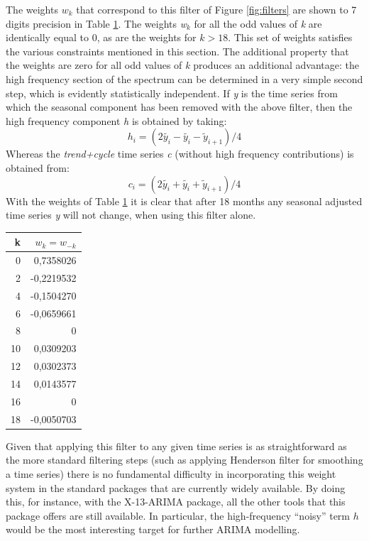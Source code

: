 \documentclass[english,blauw]{cbsdiscussionpaper}
\begin{document}
The weights $w_k$ that correspond to this filter of Figure \ref{fig:filters} are shown to 7 digits precision in Table \ref{tab:digits}. The weights \textit{w$_k$} for all the odd values of \textit{k} are identically equal to 0, as are the weights for $ k>18$. This set of weights satisfies the various constraints mentioned in this section. The additional property that the weights are zero for all odd values of\textit{ k} produces an additional advantage: the high frequency section of the spectrum can be determined in a very simple second step, which is evidently statistically independent. If \textit{y} is the time series from which the seasonal component has been removed with the above filter, then the high frequency component \textit{h} is obtained by taking:
\begin{equation}
h_i = (2 \tilde{y_i} - \tilde{y_i} - \tilde{y}_{i+1})/4
\end{equation}
Whereas the \textit{trend+cycle} time series \textit{c} (without high frequency contributions) is obtained from:
\begin{equation}
c_i = (2\tilde{y_i}+\tilde{y_i}+\tilde{y}_{i+1})/4
\end{equation}
With the weights of Table \ref{tab:digits} it is clear that after 18 months any seasonal adjusted time series \textit{y} will not change, when using this filter alone.\\
\bigskip
\begin{table}[h]
\label{tab:digits}
\centering
\begin{tabular}{r r}
k & $w_k=w_{-k}$\\
\hline
0 & 0,7358026\\
2 & -0,2219532\\
4 & -0,1504270\\
6 & -0,0659661\\
8 & 0\\
10 & 0,0309203\\
12 & 0,0302373\\
14 & 0,0143577\\
16 & 0\\
18 & -0,0050703\\
\hline
\end{tabular}
\end{table}
Given that applying this filter to any given time series is as straightforward as the more standard filtering steps (such as applying Henderson filter for smoothing a time series) there is no fundamental difficulty in incorporating this weight system in the standard packages that are currently widely available. By doing this, for instance, with the X-13-ARIMA package, all the other tools that this package offers are still available. In particular, the high-frequency ``noisy'' term $h$ would be the most interesting target for further ARIMA modelling.
\end{document}
